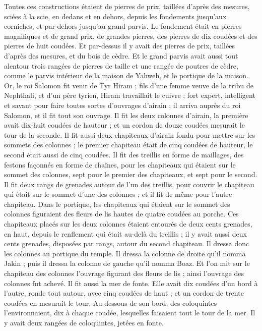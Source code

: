 \begin{multicols}{2}
Toutes ces constructions étaient de pierres de prix, taillées d’après des mesures, sciées à la scie, en dedans et en dehors, depuis les fondements jusqu'aux corniches, et par dehors jusqu'au grand parvis.
Le fondement était en pierres magnifiques et de grand prix, de grandes pierres, des pierres de dix coudées et des pierres de huit coudées.
Et par-dessus il y avait des pierres de prix, taillées d’après des mesures, et du bois de cèdre.
Et le grand parvis avait aussi tout alentour trois rangées de pierres de taille et une rangée de poutres de cèdre, comme le parvis intérieur de la maison de Yahweh, et le portique de la maison.
Or, le roi Salomon fit venir de Tyr Hiram ;
fils d'une femme veuve de la tribu de Nephthali, et d’un père tyrien, Hiram travaillait le cuivre ; fort expert, intelligent et savant pour faire toutes sortes d'ouvrages d'airain ; il arriva auprès du roi Salomon, et il fit tout son ouvrage.
Il fit les deux colonnes d'airain, la première avait dix-huit coudées de hauteur ; et un cordon de douze coudées mesurait le tour de la seconde.
Il fit aussi deux chapiteaux d'airain fondu pour mettre sur les sommets des colonnes ; le premier chapiteau était de cinq coudées de hauteur, le second était aussi de cinq coudées.
Il fit des treillis en forme de maillages, des festons façonnés en forme de chaînes, pour les chapiteaux qui étaient sur le sommet des colonnes, sept pour le premier des chapiteaux, et sept pour le second.
Il fit deux rangs de grenades autour de l’un des treillis, pour couvrir le chapiteau qui était sur le sommet d'une des colonnes ; et il fit de même pour l'autre chapiteau.
Dans le portique, les chapiteaux qui étaient sur le sommet des colonnes figuraient des fleurs de lis hautes de quatre coudées au porche.
Ces chapiteaux placés sur les deux colonnes étaient entourés de deux cents grenades, en haut, depuis le renflement qui était au-delà du treillis ; il y avait aussi deux cents grenades, disposées par rangs, autour du second chapiteau.
Il dressa donc les colonnes au portique du temple. Il dressa la colonne de droite qu’il nomma Jakin ; puis il dressa la colonne de gauche qu’il nomma Boaz.
Et l’on mit sur le chapiteau des colonnes l'ouvrage figurant des fleurs de lis ; ainsi l'ouvrage des colonnes fut achevé.
Il fit aussi la mer de fonte. Elle avait dix coudées d'un bord à l'autre, ronde tout autour, avec cinq coudées de haut ; et un cordon de trente coudées en mesurait le tour.
Au-dessous de son bord, des coloquintes l'environnaient, dix à chaque coudée, lesquelles faisaient tout le tour de la mer. Il y avait deux rangées de coloquintes, jetées en fonte.

\end{multicols}
